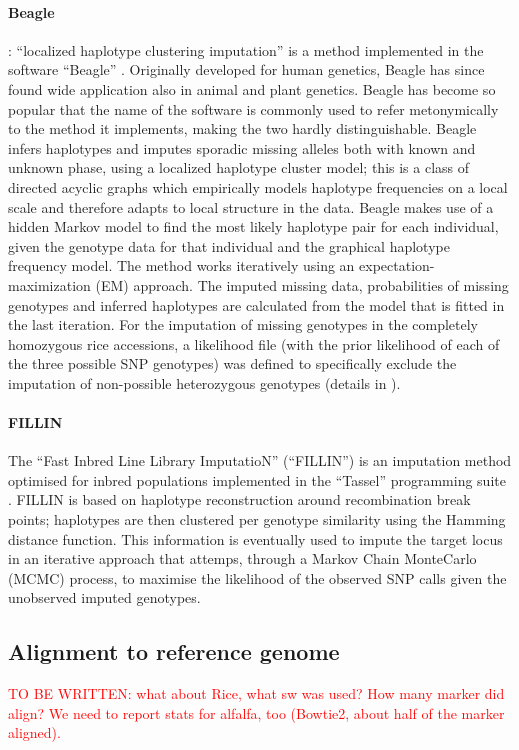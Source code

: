 \paragraph{Beagle}
\label{par:Beagle}
: ``localized haplotype clustering imputation'' is a method implemented in the software ``Beagle'' \cite{browning_rapid_2007}. Originally developed for human genetics, Beagle has since found wide application also in animal and plant genetics. Beagle has become so popular that the name of the software is commonly used  to refer metonymically to the method it implements, making the two hardly distinguishable. Beagle infers haplotypes and imputes sporadic missing alleles both with known and unknown phase, using a localized haplotype cluster model; this is a class of directed acyclic graphs which empirically models haplotype frequencies on a local scale and therefore adapts to local structure in the data. Beagle makes use of a hidden Markov model to find the most likely haplotype pair for each individual, given the genotype data for that individual and the graphical haplotype frequency model. The method works iteratively using an expectation-maximization (EM) approach. The imputed missing data, probabilities of missing genotypes and inferred haplotypes are calculated from the model that is fitted in the last iteration. For the imputation of missing genotypes in the completely homozygous rice accessions, a likelihood file (with the prior likelihood of each of the three possible SNP genotypes) was defined to specifically exclude the imputation of non-possible heterozygous genotypes (details in \cite{beagle3_manual}).

\paragraph{FILLIN}
The ``Fast Inbred Line Library ImputatioN'' (``FILLIN'') is an imputation method optimised for inbred populations implemented in the ``Tassel'' programming suite \cite{swarts_novel_2014}. FILLIN is based on haplotype reconstruction around recombination break points; haplotypes are then clustered per genotype similarity using the Hamming distance function. This information is eventually used to impute the target locus in an iterative approach that attemps, through a Markov Chain MonteCarlo (MCMC) process, to maximise the likelihood of the observed SNP calls given the unobserved imputed genotypes. 

\subsection{Alignment to reference genome}
\label{sec:alignment_to_genome}
\textcolor{red}{TO BE WRITTEN: what about Rice, what sw was used? How many marker did align? We need to report stats for alfalfa, too (Bowtie2, about half of the marker aligned).}

